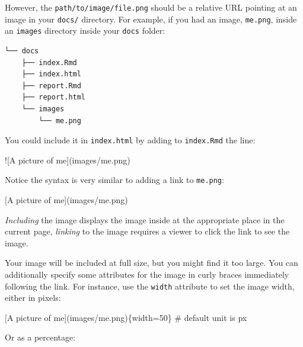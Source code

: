 \documentclass[]{Nemilov}
\newenvironment{Shaded}{\begin{snugshade}}{\end{snugshade}}
\newcommand{\AlertTok}[1]{\textcolor[rgb]{0.94,0.16,0.16}{#1}}
\newcommand{\NormalTok}[1]{#1}
\newcommand{\OtherTok}[1]{\textcolor[rgb]{0.56,0.35,0.01}{#1}}
\begin{document}
However,
the \texttt{path/to/image/file.png} should be a relative URL pointing at an image in your \texttt{docs/} directory.
For example,
if you had an image,
\texttt{me.png},
inside an \texttt{images} directory inside your \texttt{docs} folder:

\begin{verbatim}
└── docs
    ├── index.Rmd
    ├── index.html
    ├── report.Rmd
    ├── report.html
    └── images
        └── me.png
\end{verbatim}

You could include it in \texttt{index.html} by adding to \texttt{index.Rmd} the line:

\begin{Shaded}
\begin{Highlighting}[]
\AlertTok{![A picture of me](images/me.png)}
\end{Highlighting}
\end{Shaded}

Notice the syntax is very similar to adding a link to \texttt{me.png}:

\begin{Shaded}
\begin{Highlighting}[]
\OtherTok{[A picture of me](images/me.png)}
\end{Highlighting}
\end{Shaded}

\emph{Including} the image displays the image inside at the appropriate place in the current page,
\emph{linking} to the image requires a viewer to click the link to see the image.

Your image will be included at full size,
but you might find it too large.
You can additionally specify some attributes for the image in curly braces immediately following the link.
For instance,
use the \texttt{width} attribute to set the image width,
either in pixels:

\begin{Shaded}
\begin{Highlighting}[]
\OtherTok{[A picture of me](images/me.png)}\NormalTok{\{width=50\} # default unit is px}
\end{Highlighting}
\end{Shaded}

Or as a percentage:

\begin{Shaded}
\end{Shaded}
\end{document}
